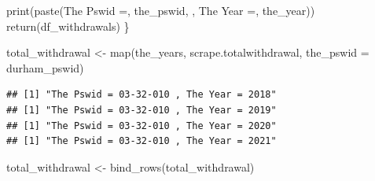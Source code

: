 \documentclass[
  12pt,
]{article}
\newenvironment{Shaded}{\begin{snugshade}}{\end{snugshade}}
\newcommand{\AttributeTok}[1]{\textcolor[rgb]{0.77,0.63,0.00}{#1}}
\newcommand{\FunctionTok}[1]{\textcolor[rgb]{0.00,0.00,0.00}{#1}}
\newcommand{\NormalTok}[1]{#1}
\newcommand{\OtherTok}[1]{\textcolor[rgb]{0.56,0.35,0.01}{#1}}
\newcommand{\StringTok}[1]{\textcolor[rgb]{0.31,0.60,0.02}{#1}}
\begin{document}
\begin{Shaded}
\begin{Highlighting}[]
  \FunctionTok{print}\NormalTok{(}\FunctionTok{paste}\NormalTok{(}\StringTok{\textquotesingle{}The Pswid =\textquotesingle{}}\NormalTok{, the\_pswid, }\StringTok{\textquotesingle{}, The Year =\textquotesingle{}}\NormalTok{, the\_year))}
  \FunctionTok{return}\NormalTok{(df\_withdrawals)}
\NormalTok{\}}

\NormalTok{total\_withdrawal }\OtherTok{\textless{}{-}} \FunctionTok{map}\NormalTok{(the\_years, scrape.totalwithdrawal, }\AttributeTok{the\_pswid =}\NormalTok{ durham\_pswid)}
\end{Highlighting}
\end{Shaded}

\begin{verbatim}
## [1] "The Pswid = 03-32-010 , The Year = 2018"
## [1] "The Pswid = 03-32-010 , The Year = 2019"
## [1] "The Pswid = 03-32-010 , The Year = 2020"
## [1] "The Pswid = 03-32-010 , The Year = 2021"
\end{verbatim}

\begin{Shaded}
\begin{Highlighting}[]
\NormalTok{total\_withdrawal }\OtherTok{\textless{}{-}} \FunctionTok{bind\_rows}\NormalTok{(total\_withdrawal)}
\end{Highlighting}
\end{Shaded}
\end{document}
